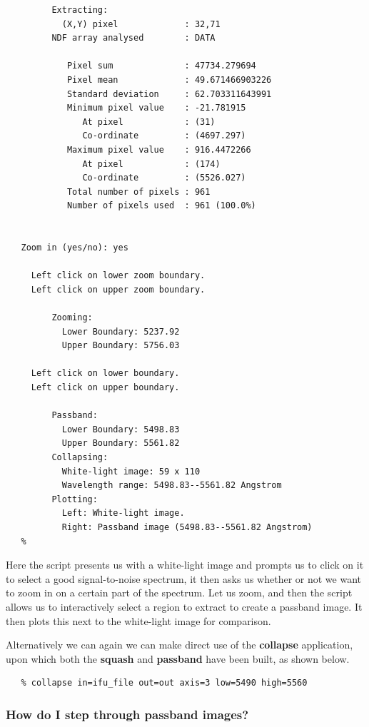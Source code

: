 \documentclass[twoside,11pt]{article}
\newcommand{\xref}[3]{#1}
\begin{document}
{\begin{verbatim}
         Extracting:
           (X,Y) pixel             : 32,71
         NDF array analysed        : DATA

            Pixel sum              : 47734.279694
            Pixel mean             : 49.671466903226
            Standard deviation     : 62.703311643991
            Minimum pixel value    : -21.781915
               At pixel            : (31)
               Co-ordinate         : (4697.297)
            Maximum pixel value    : 916.4472266
               At pixel            : (174)
               Co-ordinate         : (5526.027)
            Total number of pixels : 961
            Number of pixels used  : 961 (100.0%)

 
   Zoom in (yes/no): yes
 
     Left click on lower zoom boundary.
     Left click on upper zoom boundary.
 
         Zooming:
           Lower Boundary: 5237.92
           Upper Boundary: 5756.03
 
     Left click on lower boundary.
     Left click on upper boundary.
 
         Passband:
           Lower Boundary: 5498.83
           Upper Boundary: 5561.82
         Collapsing:
           White-light image: 59 x 110
           Wavelength range: 5498.83--5561.82 Angstrom
         Plotting:
           Left: White-light image.
           Right: Passband image (5498.83--5561.82 Angstrom)
   %
\end{verbatim}\normalsize

Here the script presents us with a white-light image and prompts us to
click on it to select a good signal-to-noise spectrum, it then asks us
whether or not we want to zoom in on a certain part of the spectrum.
Let us zoom, and then the script allows us to interactively select a
region to extract to create a passband image.  It then plots this next
to the white-light image for comparison.

Alternatively we can again we can make direct use of the {\bf collapse}
application, upon which both the \xref{{\bf squash}}{sun237}{squash}
and \xref{{\bf passband}}{sun237}{passband} have been built, as shown
below.

\small\begin{verbatim}
   % collapse in=ifu_file out=out axis=3 low=5490 high=5560
\end{verbatim}\normalsize

\subsubsection{How do I step through passband images?}

}
\end{document}
